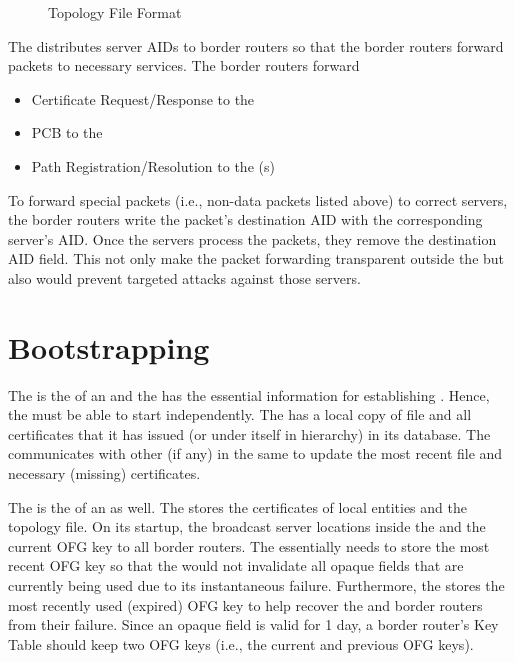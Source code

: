\begin{figure}[h]
\centering
\begin{center}
\end{center}
\caption{Topology File Format}\label{fig:topology-file}
\end{figure}


The \CS distributes server AIDs to border routers so that the border routers forward packets to necessary services. The border routers forward
\begin{itemize}
\item Certificate Request/Response to the \CS
\item PCB to the \BS
\item Path Registration/Resolution to the \PS(s)
\end{itemize}

To forward special packets (i.e., non-data packets listed above) to correct servers, the border routers write the packet's destination AID with the corresponding server's AID. Once the servers process the packets, they remove the destination AID field. This not only make the packet forwarding transparent outside the \AD but also would prevent targeted attacks against those servers.

\section{Bootstrapping}
\noindent {\bf \ISDC \CS: }
The \ISDC is the \RT of an \ISD and the \ISDC \CS has the essential information for establishing \RT. Hence, the \ISDC \CS must be able to start independently. The \ISDC \CS has a local copy of \RT file and all \AD certificates that it has issued (or under itself in \ISDC hierarchy) in its database. The \ISDC \CS communicates with other \ISDC \CSs (if any) in the same \ISD to update the most recent \RT file and necessary (missing) certificates.

\noindent {\bf \AD \CS: } The \CS is the \RT of an \AD as well. The \CS stores the certificates of local entities and the topology file. On its startup, the \CS broadcast server locations inside the \AD and the current OFG key to all border routers. The \CS essentially needs to store the most recent OFG key so that the \CS would not invalidate all opaque fields that are currently being used due to its instantaneous failure. Furthermore, the \CS stores the most recently used (expired) OFG key to help recover the \BS and border routers from their failure. Since an opaque field is valid for 1 day, a border router's Key Table should keep two OFG keys (i.e., the current and previous OFG keys).

